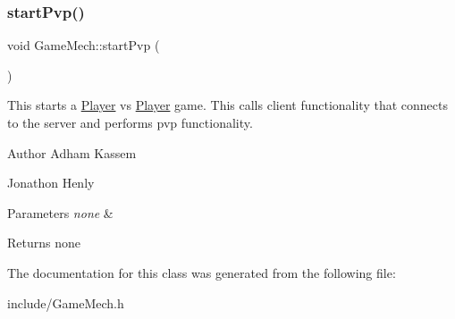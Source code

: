 \subsubsection{\texorpdfstring{start\+Pvp()}{startPvp()}}
{\footnotesize\ttfamily void Game\+Mech\+::start\+Pvp (\begin{DoxyParamCaption}{ }\end{DoxyParamCaption})\hspace{0.3cm}{\ttfamily [inline]}}

This starts a \hyperlink{classPlayer}{Player} vs \hyperlink{classPlayer}{Player} game. This calls client functionality that connects to the server and performs pvp functionality. \begin{DoxyAuthor}{Author}
Adham Kassem 

Jonathon Henly 
\end{DoxyAuthor}

\begin{DoxyParams}{Parameters}
{\em none} & \\
\hline
\end{DoxyParams}
\begin{DoxyReturn}{Returns}
none 
\end{DoxyReturn}


The documentation for this class was generated from the following file\+:\begin{DoxyCompactItemize}
\item 
include/Game\+Mech.\+h\end{DoxyCompactItemize}
